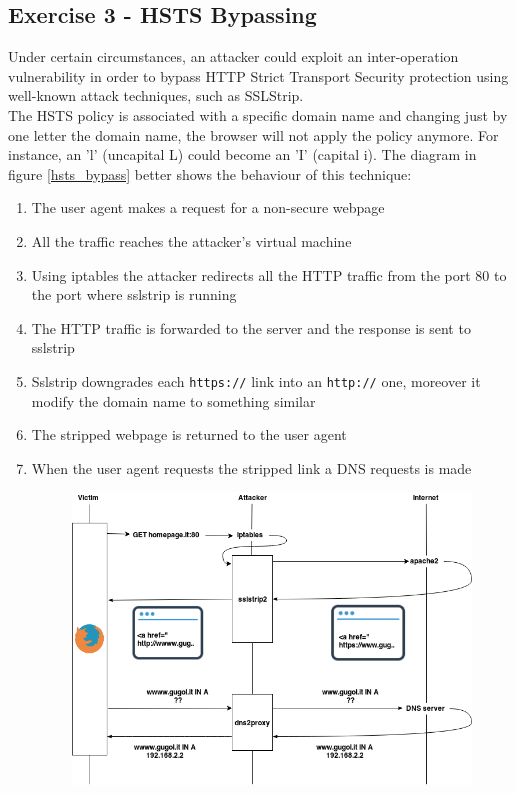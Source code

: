 \documentclass[final]{article}
\begin{document}
\subsection{Exercise 3 - HSTS Bypassing}
Under certain circumstances, an attacker could exploit an inter-operation vulnerability in order to bypass HTTP Strict Transport Security protection using well-known attack techniques, such as SSLStrip. \cite{selvi2014bypassing}\\
The HSTS policy is associated with a specific domain name and changing just by one letter the domain name, the browser will
not apply the policy anymore. For instance, an ’l’ (uncapital L) could become an ’I’ (capital i).
The diagram in figure \ref{hsts_bypass} better shows the behaviour of this technique:
\begin{enumerate}
  \item The user agent makes a request for a non-secure webpage
  \item All the traffic reaches the attacker's virtual machine
  \item Using iptables the attacker redirects all the HTTP traffic from the port 80 to the port where sslstrip is running
  \item The HTTP traffic is forwarded to the server and the response is sent to sslstrip
  \item Sslstrip downgrades each \texttt{https://} link into an \texttt{http://} one, moreover it modify the domain name to something similar
  \item The stripped webpage is returned to the user agent
  \item When the user agent requests the stripped link a DNS requests is made
  \begin{figure}[h]
    \center
    \includegraphics[width=\textwidth]{../figures/hsts_bypass_time}

\end{figure}
\end{enumerate}
\end{document}
